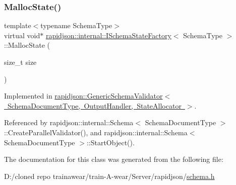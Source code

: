 \subsubsection{\texorpdfstring{MallocState()}{MallocState()}}
{\footnotesize\ttfamily template$<$typename Schema\+Type$>$ \\
virtual void$\ast$ \mbox{\hyperlink{classrapidjson_1_1internal_1_1_i_schema_state_factory}{rapidjson\+::internal\+::\+I\+Schema\+State\+Factory}}$<$ Schema\+Type $>$\+::Malloc\+State (\begin{DoxyParamCaption}\item[{size\+\_\+t}]{size }\end{DoxyParamCaption})\hspace{0.3cm}{\ttfamily [pure virtual]}}



Implemented in \mbox{\hyperlink{classrapidjson_1_1_generic_schema_validator_a73d58da18b6e77665daaa977852f205c}{rapidjson\+::\+Generic\+Schema\+Validator$<$ Schema\+Document\+Type, Output\+Handler, State\+Allocator $>$}}.



Referenced by rapidjson\+::internal\+::\+Schema$<$ Schema\+Document\+Type $>$\+::\+Create\+Parallel\+Validator(), and rapidjson\+::internal\+::\+Schema$<$ Schema\+Document\+Type $>$\+::\+Start\+Object().



The documentation for this class was generated from the following file\+:\begin{DoxyCompactItemize}
\item 
D\+:/cloned repo trainawear/train-\/\+A-\/wear/\+Server/rapidjson/\mbox{\hyperlink{schema_8h}{schema.\+h}}\end{DoxyCompactItemize}
